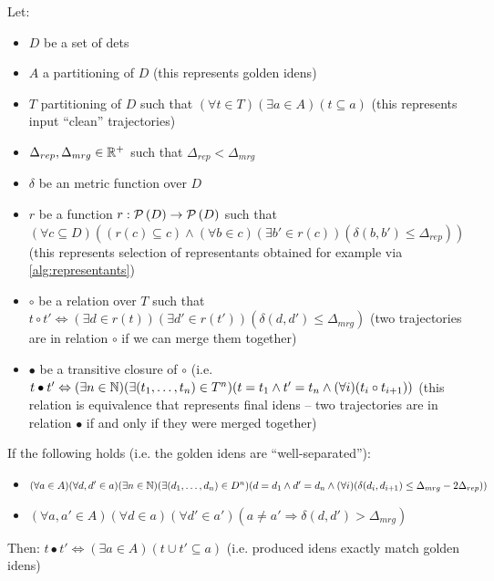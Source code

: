 \begin{claim}
\label{clm:claim}
Let:

\setlength{\itemsep}{0pt}
\setlength{\parskip}{0pt}

\begin{itemize}
    \item $D$ be a set of \glspl{det}
    \item $A$ a partitioning of $D$ (this represents golden \glspl{iden})
    \item $T$ partitioning of $D$ such that $(\forall t \in T) (\exists a \in A) (t \subseteq a)$ (this represents input ``clean'' trajectories)
    \item $\Delta_{rep}, \Delta_{mrg} \in \mathbb{R}^+$ such that $\Delta_{rep} < \Delta_{mrg}$
    \item $\delta$ be an metric function over $D$
    \item $r$ be a function $r: \mathcal{P}\left(D\right) \rightarrow \mathcal{P}\left(D\right)$ such that $(\forall c \subseteq D)((r(c) \subseteq c) \land (\forall b \in c) (\exists b' \in r(c)) (\delta(b, b') \leq \Delta_{rep}))$ (this represents selection of representants obtained for example via \autoref{alg:representants})
    \item $\circ$ be a relation over $T$ such that $t\circ t' \Leftrightarrow (\exists d \in r(t)) (\exists d' \in r(t')) (\delta(d, d') \leq \Delta_{mrg})$ (two trajectories are in relation $\circ$ if we can merge them together)
    \item $\bullet$ be a transitive closure of $\circ$ (i.e. $t \bullet t' \Leftrightarrow (\exists n \in \mathbb{N}) (\exists (t_1, \ldots, t_n) \in T^n) (t = t_1 \land t' = t_n \land (\forall i) (t_i\circ t_{i+1}))$ (this relation is equivalence that represents final \glspl{iden} -- two trajectories are in relation $\bullet$ if and only if they were merged together)
\end{itemize}

If the following holds (i.e. the golden \glspl{iden} are ``well-separated''):
\begin{itemize}
    \item $(\forall a \in A)(\forall d, d' \in a) (\exists n \in \mathbb{N}) (\exists (d_1, \ldots, d_n) \in D^n) (d = d_1 \land d' = d_n \land (\forall i) (\delta(d_i, d_{i+1}) \leq \Delta_{mrg} - 2\Delta_{rep}))$
    \item $(\forall a, a' \in A) (\forall d \in a) (\forall d' \in a') (a \neq a' \Rightarrow \delta(d, d') > \Delta_{mrg})$
\end{itemize}

Then: $t\bullet t' \Leftrightarrow (\exists a \in A) (t \cup t' \subseteq a)$ (i.e. produced \glspl{iden} exactly match golden \glspl{iden})


\end{claim}
